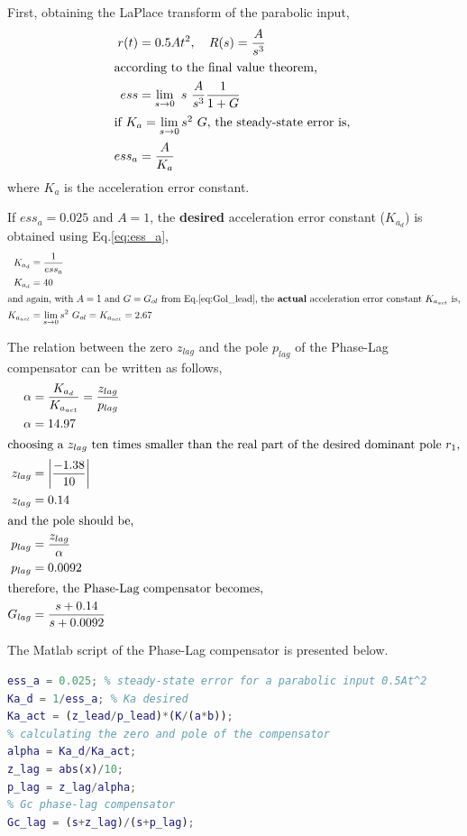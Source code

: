 \documentclass[11pt, a4paper]{article}
\begin{document}
First, obtaining the LaPlace transform of the parabolic input,
\begin{align}
r(t) &= 0.5 A t^2, \quad R(s) = \frac{A}{s^3} \nonumber\\
\intertext{according to the final value theorem,}
ess &= \lim\limits_{s\rightarrow 0}~ s~\dfrac{A}{s^3} \dfrac{1}{1+G}  \\
\intertext{if $K_a = \lim\limits_{s\rightarrow 0} s^2~G$, the steady-state error is, } 
ess_a &= \dfrac{A}{K_a} \label{eq:ess_a}
\end{align}
where $K_a$ is the acceleration error constant.

If $ess_a=0.025$ and $A=1$, the \textbf{desired} acceleration error constant ($K_{a_d}$) is obtained using Eq.\eqref{eq:ess_a},
\begin{align}
K_{a_d} &= \frac{1}{ess_a} \nonumber\\
K_{a_d} &= 40 \nonumber\\
\intertext{and again, with $A=1$ and $G=G_{ol}$ from  Eq.\eqref{eq:Gol_lead}, the \textbf{actual} acceleration error constant $K_{a_{act}}$ is,}
K_{a_{act}} &= \lim\limits_{s\rightarrow 0} s^2~ G_{ol} = K_{a_{act}} = 2.67 \nonumber
\end{align}

The relation between the zero $z_{lag}$ and the pole $p_{lag}$ of the Phase-Lag compensator can be written as follows,
\begin{align}
\alpha &= \dfrac{K_{a_d}}{K_{a_{act}}} = \dfrac{z_{lag}}{p_{lag}}\\
\alpha &= 14.97 \nonumber\\
\intertext{choosing a $z_{lag}$ ten times smaller than the real part of the desired dominant pole $r_1$,}
z_{lag} &= \left| \dfrac{-1.38}{10} \right| \nonumber\\
z_{lag} &= 0.14 \nonumber\\
\intertext{and the pole should be,}
p_{lag} &= \dfrac{z_{lag}}{\alpha} \nonumber\\
p_{lag} &= 0.0092 \nonumber\\
\intertext{therefore, the Phase-Lag compensator becomes,}
G_{lag} &= \dfrac{s+0.14}{s+0.0092} \nonumber
\end{align}

The Matlab script of the Phase-Lag compensator is presented below.
\begin{lstlisting}[language=matlab, caption={}, label={}]
%% d) Phase-lag compensator
ess_a = 0.025; % steady-state error for a parabolic input 0.5At^2
Ka_d = 1/ess_a; % Ka desired
Ka_act = (z_lead/p_lead)*(K/(a*b));
% calculating the zero and pole of the compensator
alpha = Ka_d/Ka_act;
z_lag = abs(x)/10;
p_lag = z_lag/alpha;
% Gc phase-lag compensator
Gc_lag = (s+z_lag)/(s+p_lag);
\end{lstlisting}
\end{document}
